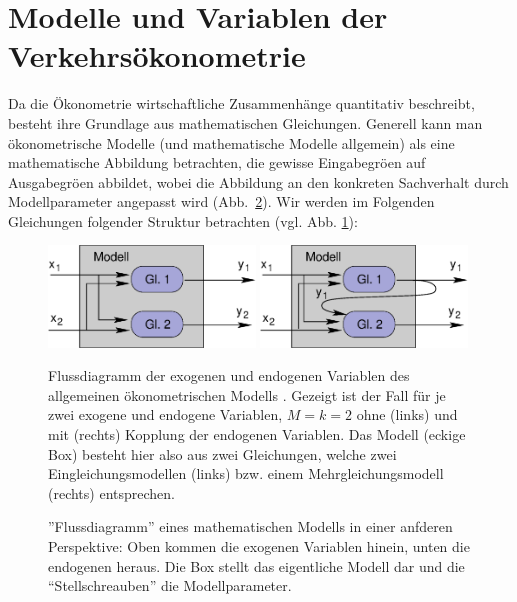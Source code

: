 \section{\label{sec:oekonMod}Modelle und Variablen der Verkehrs\"okonometrie}

Da die  \"Okonometrie wirtschaftliche Zusammenh\"ange quantitativ beschreibt,
besteht ihre Grundlage aus mathematischen Gleichungen. Generell kann
man \"okonometrische Modelle (und mathematische Modelle allgemein) als
eine mathematische Abbildung betrachten, die gewisse Eingabegr\"o\3en
auf Ausgabegr\"o\3en abbildet, wobei die Abbildung an den konkreten
Sachverhalt durch Modellparameter angepasst wird
(Abb.~\ref{fig:trichter}). Wir werden im Folgenden
Gleichungen folgender Struktur betrachten 
(vgl. Abb. \ref{fig:flussdiag}):

\begin{figure}
\includegraphics[width=0.49\textwidth]{figsAllg/flussdiag-Normal.eps}
\includegraphics[width=0.49\textwidth]{figsAllg/flussdiag-Kopplung.eps}
\caption{\label{fig:flussdiag}Flussdiagramm der exogenen und
endogenen Variablen des allgemeinen \"okonometrischen Modells
\protect{}. Gezeigt ist der Fall f\"ur je zwei exogene und
endogene Variablen, $M=k=2$ ohne (links) und mit (rechts) Kopplung der
endogenen Variablen. Das Modell (eckige Box) besteht hier also
aus zwei Gleichungen, welche zwei Eingleichungsmodellen (links)
bzw. einem Mehrgleichungsmodell (rechts) entsprechen.
}
\end{figure}

\begin{figure}
\caption{\label{fig:trichter}''Flussdiagramm'' eines mathematischen
Modells in einer anfderen Perspektive: Oben kommen die exogenen
Variablen hinein, unten die endogenen heraus. Die Box stellt das
eigentliche Modell dar und die ``Stellschreauben'' die Modellparameter.
}
\end{figure}


